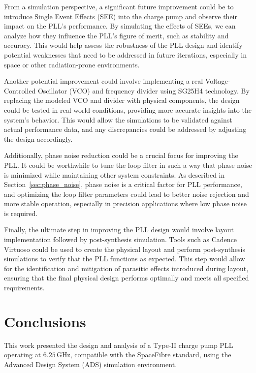 \documentclass[lettersize,journal]{IEEEtran}
\begin{document}
From a simulation perspective, a significant future improvement could be to introduce Single Event Effects (SEE) into the charge pump and observe their impact on the PLL's performance. By simulating the effects of SEEs, we can analyze how they influence the PLL's figure of merit, such as stability and accuracy. This would help assess the robustness of the PLL design and identify potential weaknesses that need to be addressed in future iterations, especially in space or other radiation-prone environments.

Another potential improvement could involve implementing a real Voltage-Controlled Oscillator (VCO) and frequency divider using SG25H4 technology. By replacing the modeled VCO and divider with physical components, the design could be tested in real-world conditions, providing more accurate insights into the system's behavior. This would allow the simulations to be validated against actual performance data, and any discrepancies could be addressed by adjusting the design accordingly.

Additionally, phase noise reduction could be a crucial focus for improving the PLL. It could be worthwhile to tune the loop filter in such a way that phase noise is minimized while maintaining other system constraints. As described in Section~\ref{sec:phase_noise}, phase noise is a critical factor for PLL performance, and optimizing the loop filter parameters could lead to better noise rejection and more stable operation, especially in precision applications where low phase noise is required.

Finally, the ultimate step in improving the PLL design would involve layout implementation followed by post-synthesis simulation. Tools such as Cadence Virtuoso could be used to create the physical layout and perform post-synthesis simulations to verify that the PLL functions as expected. This step would allow for the identification and mitigation of parasitic effects introduced during layout, ensuring that the final physical design performs optimally and meets all specified requirements.

\section{Conclusions}
\label{sec:conslusions}
This work presented the design and analysis of a Type-II charge pump PLL operating at \(6.25 \, \text{GHz}\), compatible with the SpaceFibre standard, using the Advanced Design System (ADS) simulation environment. 
\end{document}

